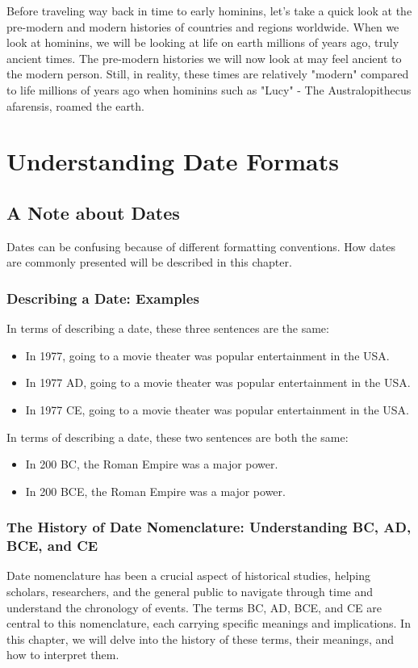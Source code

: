 \documentclass{book}
\begin{document}
Before traveling way back in time to early hominins, let's take a quick look at the pre-modern and modern histories of countries and regions worldwide. When we look at hominins, we will be looking at life on earth millions of years ago, truly ancient times. The pre-modern histories we will now look at may feel ancient to the modern person. Still, in reality, these times are relatively "modern" compared to life millions of years ago when hominins such as "Lucy" - The Australopithecus afarensis, roamed the earth. 

\chapter{Understanding Date Formats}
\section*{A Note about Dates}
Dates can be confusing because of different formatting conventions. How dates are commonly presented will be described in this chapter.

\subsection*{Describing a Date: Examples}
In terms of describing a date, these three sentences are the same:

\begin{itemize}
    \item In 1977, going to a movie theater was popular entertainment in the USA.
    \item In 1977 AD, going to a movie theater was popular entertainment in the USA.
    \item In 1977 CE, going to a movie theater was popular entertainment in the USA.
\end{itemize}

In terms of describing a date, these two sentences are both the same:

\begin{itemize}
    \item In 200 BC, the Roman Empire was a major power.
    \item In 200 BCE, the Roman Empire was a major power.
\end{itemize}

\subsection*{The History of Date Nomenclature: Understanding BC, AD, BCE, and CE}
Date nomenclature has been a crucial aspect of historical studies, helping scholars, researchers, and the general public to navigate through time and understand the chronology of events. The terms BC, AD, BCE, and CE are central to this nomenclature, each carrying specific meanings and implications. In this chapter, we will delve into the history of these terms, their meanings, and how to interpret them.
\end{document}

